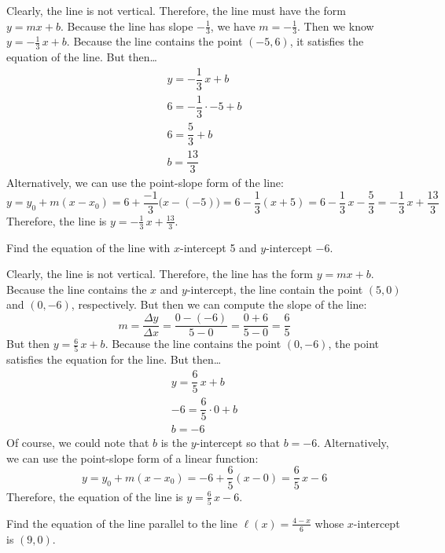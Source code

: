 \documentclass[11pt,letterpaper]{article}
\begin{document}
\sol Clearly, the line is not vertical. Therefore, the line must have the form $y= mx + b$. Because the line has slope $-\frac{1}{3}$, we have $m= -\frac{1}{3}$. Then we know $y= -\frac{1}{3}\,x + b$. Because the line contains the point $(-5, 6)$, it satisfies the equation of the line. But then\dots
	\[
	\begin{gathered}
	y= -\dfrac{1}{3}\,x + b \\
	6= -\dfrac{1}{3} \cdot -5 + b \\
	6= \dfrac{5}{3} + b \\
	b= \dfrac{13}{3}
	\end{gathered}
	\]
Alternatively, we can use the point-slope form of the line:
	\[
	y= y_0 + m(x - x_0)= 6 + \dfrac{-1}{3} \big(x - (-5) \big)= 6 - \dfrac{1}{3} (x + 5)= 6 - \dfrac{1}{3}\,x - \dfrac{5}{3}= -\dfrac{1}{3}\,x + \dfrac{13}{3}
	\]
Therefore, the line is $y= -\frac{1}{3}\,x + \frac{13}{3}$.



\newpage



 Find the equation of the line with $x$-intercept 5 and $y$-intercept $-6$. \pspace

\sol Clearly, the line is not vertical. Therefore, the line has the form $y= mx + b$. Because the line contains the $x$ and $y$-intercept, the line contain the point $(5, 0)$ and $(0, -6)$, respectively. But then we can compute the slope of the line:
	\[
	m= \dfrac{\Delta y}{\Delta x}= \dfrac{0 - (-6)}{5 - 0}= \dfrac{0 + 6}{5 - 0}= \dfrac{6}{5}
	\]
But then $y= \frac{6}{5}\,x + b$. Because the line contains the point $(0, -6)$, the point satisfies the equation for the line. But then\dots
	\[
	\begin{gathered}
	y= \dfrac{6}{5}\,x + b \\
	-6= \dfrac{6}{5} \cdot 0 + b \\
	b= -6
	\end{gathered}
	\]
Of course, we could note that $b$ is the $y$-intercept so that $b= -6$. Alternatively, we can use the point-slope form of a linear function:
	\[
	y= y_0 + m(x - x_0)= -6 + \dfrac{6}{5} (x - 0)= \dfrac{6}{5}\,x - 6
	\]	
Therefore, the equation of the line is $y= \frac{6}{5}\,x - 6$. 



\newpage



 Find the equation of the line parallel to the line $\ell(x)= \frac{4 - x}{6}$ whose $x$-intercept is $(9, 0)$. \pspace
\end{document}
